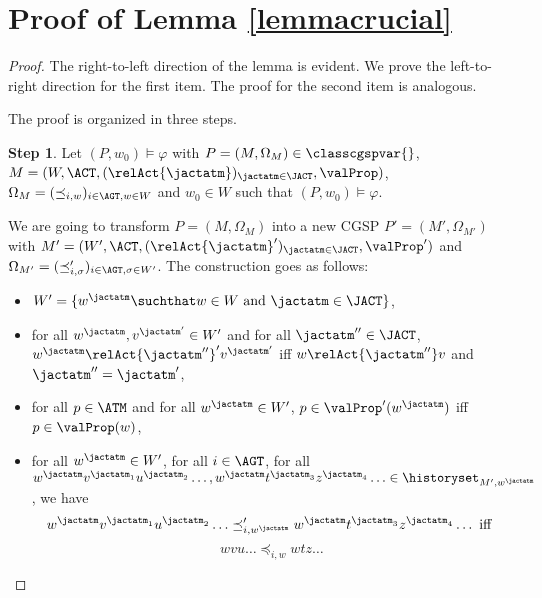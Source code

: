 
\appendix

\section{Proof of Lemma 
\ref{lemmacrucial}}\label{prooflemmatree}

\begin{proof}
    The right-to-left direction of the lemma is evident.
    We prove the left-to-right direction
    for the first item.  
The proof for the second  item
is analogous. 

The proof is organized in three steps.

\textbf{Step 1}. 
    Let 
    $(P,w_0 )\models \varphi $
with 
$P=(M,\Omega_M) \in
\classcgspvar{ }$, 
 $M = ( W,  \ACT, \\ (\relAct{\jactatm}   )_{\jactatm \in \JACT}, 
  \valProp  )$,
  $\Omega_{M }=(\preceq_{i,w }   )_{i \in \AGT, w \in W }$
  and $w_0 \in W $
  such that $(P,w_0)\models \varphi$. 

  We are going to transform 
  $P=(M,\Omega_M)$ into a new CGSP 
    $P'=(M',\Omega_{M'})$
    with 
     $M' = ( W',  \ACT,  (\relAct{\jactatm}'   )_{\jactatm \in \JACT}, 
  \valProp'   )$
  and $\Omega_{M'}=(\preceq_{i,\sigma  }'   )_{i \in \AGT, \sigma  \in W' }$. 
  The construction goes as follows: 

     \begin{itemize}
\item $W' = \{w^\jactatm \suchthat
w \in W \text{ and }
\jactatm \in \JACT
\}$, 

\item for all $w^\jactatm , v^{\jactatm' }  \in W'$
and for all $\jactatm'' \in \JACT$,
$w^\jactatm  \relAct{\jactatm''}'  v^{\jactatm' }$
iff $w  \relAct{\jactatm''}  v$
and 
$\jactatm''=\jactatm' $, 






\item for all $p \in \ATM$ and for all $w^\jactatm  \in W'$,
$p \in \valProp'( w^\jactatm )$
iff $p \in \valProp( w )$,

\item 
for all $w^\jactatm  \in W'$,
for all $i \in \AGT $, for all $w^\jactatm  v^{\jactatm_1}
 u^{\jactatm_2} \ldots , \allowbreak
w^\jactatm  t^{\jactatm_3}
 z^{\jactatm_4} \ldots \in \historyset_{M',w^\jactatm }$, 
we have 
$$w^\jactatm  v^{\jactatm_1}
 u^{\jactatm_2} \ldots \preceq_{i,w^\jactatm   }' 
 w^\jactatm  t^{\jactatm_3}
 z^{\jactatm_4} \ldots \text{ iff }$$
$$ w v
 u \ldots \preceq_{i,w   }  w  t
 z \ldots   $$




\end{itemize}
\end{proof}
